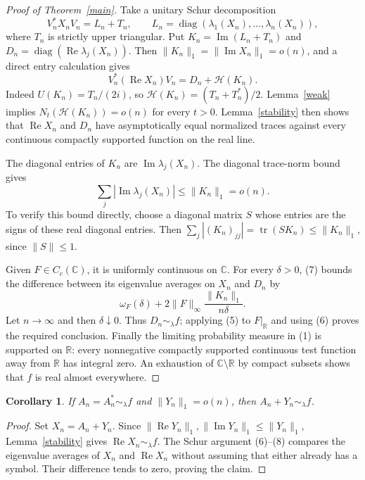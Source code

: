 \documentclass[11pt]{article}
\newtheorem{corollary}{Corollary}
\newcommand{\tr}{\operatorname{tr}}
\newcommand{\Rea}{\operatorname{Re}}
\newcommand{\Ima}{\operatorname{Im}}
\newcommand{\HH}{\mathcal H}
\begin{document}
\begin{proof}[Proof of Theorem~\ref{main}]
Take a unitary Schur decomposition
\[
 V_n^*X_nV_n=L_n+T_n,\qquad
 L_n=\operatorname{diag}(\lambda_1(X_n),\ldots,\lambda_n(X_n)),
\]
where \(T_n\) is strictly upper triangular.
Put \(K_n=\Ima(L_n+T_n)\) and
\(D_n=\operatorname{diag}(\Rea\lambda_j(X_n))\).
Then \(\|K_n\|_1=\|\Ima X_n\|_1=o(n)\), and a direct entry calculation gives
\[
 V_n^*(\Rea X_n)V_n=D_n+\HH(K_n).
 \tag{6}
\]
Indeed \(U(K_n)=T_n/(2i)\), so
\(\HH(K_n)=(T_n+T_n^*)/2\).
Lemma~\ref{weak} implies
\(N_t(\HH(K_n))=o(n)\) for every \(t>0\).
Lemma~\ref{stability} then shows that \(\Rea X_n\) and \(D_n\)
have asymptotically equal normalized traces against every continuous
compactly supported function on the real line.

The diagonal entries of \(K_n\) are \(\Ima\lambda_j(X_n)\).
The diagonal trace-norm bound gives
\[
 \sum_j|\Ima\lambda_j(X_n)|\le\|K_n\|_1=o(n).
 \tag{7}
\]
To verify this bound directly, choose a diagonal matrix \(S\) whose
entries are the signs of these real diagonal entries. Then
\(\sum_j|(K_n)_{jj}|=\tr(SK_n)\le\|K_n\|_1\), since \(\|S\|\le1\).

Given \(F\in C_c(\mathbb C)\), it is uniformly continuous on \(\mathbb C\).
For every \(\delta>0\), (7) bounds the difference between its eigenvalue
averages on \(X_n\) and \(D_n\) by
\[
 \omega_F(\delta)
 +2\|F\|_\infty\frac{\|K_n\|_1}{n\delta}.
 \tag{8}
\]
Let \(n\to\infty\) and then \(\delta\downarrow0\).
Thus \(D_n\sim_\lambda f\); applying (5) to \(F|_{\mathbb R}\)
and using (6) proves the required conclusion.
Finally the limiting probability measure in (1) is supported on
\(\mathbb R\): every nonnegative compactly supported continuous test
function away from \(\mathbb R\) has integral zero.
An exhaustion of \(\mathbb C\setminus\mathbb R\) by compact subsets
shows that \(f\) is real almost everywhere.
\end{proof}

\begin{corollary}\label{forward}
If \(A_n=A_n^*\sim_\lambda f\) and \(\|Y_n\|_1=o(n)\), then
\(A_n+Y_n\sim_\lambda f\).
\end{corollary}
\begin{proof}
Set \(X_n=A_n+Y_n\). Since
\(\|\Rea Y_n\|_1,\|\Ima Y_n\|_1\le\|Y_n\|_1\),
Lemma~\ref{stability} gives \(\Rea X_n\sim_\lambda f\).
The Schur argument (6)--(8) compares the eigenvalue averages of
\(X_n\) and \(\Rea X_n\) without assuming that either already has
a symbol. Their difference tends to zero, proving the claim.
\end{proof}
\end{document}
